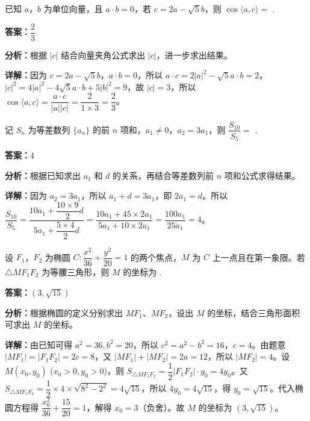 \begin{question}[points=5]
已知 $a$，$b$ 为单位向量，且 $a\cdot b=0$，若 $c = 2a - \sqrt{5}b$，则 $\cos\langle a,c\rangle =$ .
\fillin[{$\dfrac{2}{3}$}]
\begin{solution}
\textbf{答案：}$\dfrac{2}{3}$

\textbf{分析：}根据 $|c|$ 结合向量夹角公式求出 $|c|$，进一步求出结果。

\textbf{详解：}因为 $c = 2a - \sqrt{5}b$，$a\cdot b=0$，所以 $a\cdot c = 2|a|^2 - \sqrt{5}a\cdot b = 2$，$|c|^2 = 4|a|^2 -4\sqrt{5}a\cdot b + 5|b|^2 = 9$，故 $|c|=3$，所以 $\cos\langle a,c\rangle = \dfrac{a\cdot c}{|a||c|} = \dfrac{2}{1\times 3} = \dfrac{2}{3}$。
\end{solution}
\end{question}

\begin{question}[points=5]
记 $S_n$ 为等差数列 $\{a_n\}$ 的前 $n$ 项和，$a_1\neq 0$，$a_2 = 3a_1$，则 $\dfrac{S_{10}}{S_5}=$ .
\fillin[{$4$}]
\begin{solution}
\textbf{答案：}$4$

\textbf{分析：}根据已知求出 $a_1$ 和 $d$ 的关系，再结合等差数列前 $n$ 项和公式求得结果。

\textbf{详解：}因为 $a_2 = 3a_1$，所以 $a_1 + d = 3a_1$，即 $2a_1 = d$。所以 $\dfrac{S_{10}}{S_5} = \dfrac{10a_1 + \dfrac{10\times 9}{2}d}{5a_1 + \dfrac{5\times 4}{2}d} = \dfrac{10a_1 + 45\times 2a_1}{5a_1 + 10\times 2a_1} = \dfrac{100a_1}{25a_1} = 4$。
\end{solution}
\end{question}

\begin{question}[points=5]
设 $F_1$，$F_2$ 为椭圆 $C: \dfrac{x^2}{36} + \dfrac{y^2}{20} = 1$ 的两个焦点，$M$ 为 $C$ 上一点且在第一象限。若 $\triangle MF_1F_2$ 为等腰三角形，则 $M$ 的坐标为 .
\fillin[{$(3,\sqrt{15})$}]
\begin{solution}
\textbf{答案：}$(3,\sqrt{15})$

\textbf{分析：}根据椭圆的定义分别求出 $MF_1$、$MF_2$，设出 $M$ 的坐标，结合三角形面积可求出 $M$ 的坐标。

\textbf{详解：}由已知可得 $a^2=36,b^2=20$，所以 $c^2=a^2-b^2=16$，$c=4$。由题意 $|MF_1| = |F_1F_2| = 2c = 8$，又 $|MF_1| + |MF_2| = 2a = 12$，所以 $|MF_2| = 4$。设 $M(x_0,y_0)$ ($x_0>0,y_0>0$)，则 $S_{\triangle MF_1F_2} = \dfrac{1}{2} |F_1F_2|\cdot y_0 = 4y_0$。又 $S_{\triangle MF_1F_2} = \dfrac{1}{2} \times 4 \times \sqrt{8^2-2^2} = 4\sqrt{15}$，所以 $4y_0 = 4\sqrt{15}$，得 $y_0 = \sqrt{15}$。代入椭圆方程得 $\dfrac{x_0^2}{36} + \dfrac{15}{20} = 1$，解得 $x_0 = 3$（负舍）。故 $M$ 的坐标为 $(3,\sqrt{15})$。
\end{solution}
\end{question}

